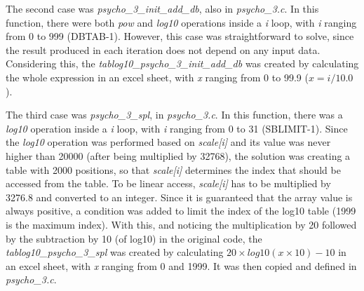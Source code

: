 \begin{comment}
\begin{figure}[H]
\centerline{\fbox{\texttt{[image: powerdensityspectrum.pdf]}}}
\caption{\textit{psycho\_3\_powerdensityspectrum} function.}
\label{powerdensityspectrum}
\end{figure}
\end{comment}


The second case was \textit{psycho\_3\_init\_add\_db}, also in \textit{psycho\_3.c}. In this function, there were both \textit{pow} and \textit{log10} operations inside a \textit{i} loop, with \textit{i} ranging from 0 to 999 (DBTAB-1). However, this case was straightforward to solve, since the result produced in each iteration does not depend on any input data. Considering this, the \textit{tablog10\_psycho\_3\_init\_add\_db} was created by calculating the whole expression in an excel sheet, with \textit{x} ranging from 0 to 99.9 ($x=i/10.0$).

\begin{comment}
\begin{figure}[H]
\centerline{\fbox{\texttt{[image: init.pdf]}}}
\caption{\textit{psycho\_3\_init\_add\_db} function.}
\label{init}
\end{figure}
\end{comment}


The third case was \textit{psycho\_3\_spl}, in \textit{psycho\_3.c}. In this function, there was a \textit{log10} operation inside a \textit{i} loop, with \textit{i} ranging from 0 to 31 (SBLIMIT-1). Since the \textit{log10} operation was performed based on \textit{scale[i]} and its value was never higher than 20000 (after being multiplied by 32768), the solution was creating a table with 2000 positions, so that \textit{scale[i]} determines the index that should be accessed from the table. 
To be linear access, \textit{scale[i]} has to be multiplied by 3276.8 and converted to an integer. Since it is guaranteed that the array value is always positive, a condition was added to limit the index of the log10 table (1999 is the maximum index). With this, and noticing the multiplication by 20 followed by the subtraction by 10 (of log10) in the original code, the \textit{tablog10\_psycho\_3\_spl} was created by calculating $20\times log10(x\times 10)-10$ in an excel sheet, with \textit{x} ranging from 0 and 1999. It was then copied and defined in \textit{psycho\_3.c}.

